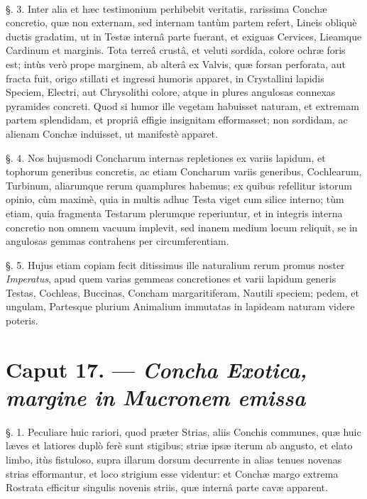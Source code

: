 \documentclass[a4paper, 11pt, oneside, polutonikogreek, german]{article}
\begin{document}
\paragraph{}
§. 3. Inter alia et hæc testimonium perhibebit veritatis, rarissima Conchæ concretio, quæ non externam, sed internam tantùm partem refert, Lineis obliquè ductis gradatim, ut in Testæ internâ parte fuerant, et exiguas Cervices, Lieamque Cardinum et marginis. Tota terreâ crustâ, et veluti sordida, colore ochræ foris est; intùs verò prope marginem, ab alterâ ex Valvis, quæ forsan perforata, aut fracta fuit, origo stillati et ingressi humoris apparet, in Crystallini lapidis Speciem, Electri, aut Chrysolithi colore, atque in plures angulosas connexas pyramides concreti. Quod si humor ille vegetam habuisset naturam, et extremam partem splendidam, et propriâ effigie insignitam efformasset; non sordidam, ac alienam Conchæ induisset, ut manifestè apparet.

§. 4. Nos hujusmodi Concharum internas repletiones ex variis lapidum, et tophorum generibus concretis, ac etiam Concharum variis generibus, Cochlearum, Turbinum, aliarumque rerum quamplures habemus; ex quibus refellitur istorum opinio, cùm maximè, quia in multis adhuc Testa viget cum silice interno; tùm etiam, quia fragmenta Testarum plerumque reperiuntur, et in integris interna concretio non omnem vacuum implevit, sed inanem medium locum reliquit, se in angulosas gemmas contrahens per circumferentiam.

§. 5. Hujus etiam copiam fecit ditissimus ille naturalium rerum promus noster \emph{Imperatus}, apud quem varias gemmeas concretiones et varii lapidum generis Testas, Cochleas, Buccinas, Concham margaritiferam, Nautili speciem; pedem, et ungulam, Partesque plurium Animalium immutatas in lapideam naturam videre poteris.

\section{Caput 17. --- \emph{Concha Exotica, margine in Mucronem emissa}}
\paragraph{}
§. 1. Peculiare huic rariori, quod præter Strias, aliis Conchis communes, quæ huic læves et latiores duplò ferè sunt stigibus; striæ ipsæ iterum ab angusto, et elato limbo, itùs fistuloso, supra illarum dorsum decurrente in alias tenues novenas strias efformantur, et loco strigium esse videntur: et Conchæ margo extrema Rostrata efficitur singulis novenis striis, quæ internâ parte cavæ apparent.
\end{document}
